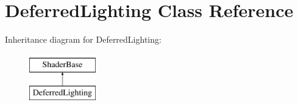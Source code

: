 \hypertarget{classDeferredLighting}{\section{\-Deferred\-Lighting \-Class \-Reference}
\label{classDeferredLighting}
}
\-Inheritance diagram for \-Deferred\-Lighting\-:\begin{figure}[H]
\begin{center}
\leavevmode
\includegraphics[height=2.000000cm]{classDeferredLighting}
\end{center}
\end{figure}

